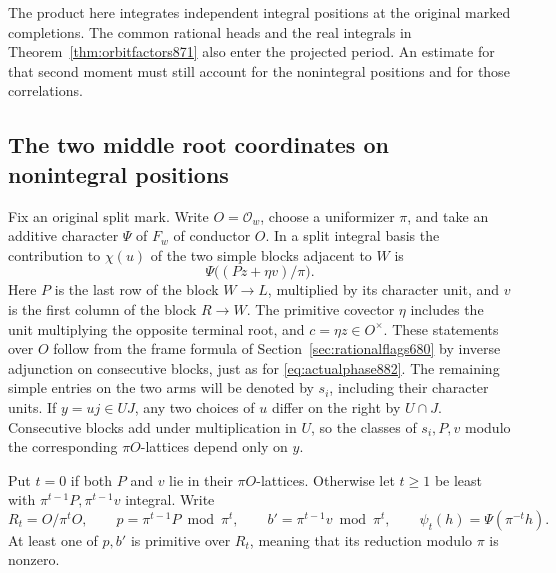 \documentclass[a4paper,11pt]{article}
\theoremstyle{definition}
\theoremstyle{remark}
\numberwithin{equation}{section}
\begin{document}
The product here integrates independent integral positions at the
original marked completions. The common rational heads and the real
integrals in Theorem~\ref{thm:orbitfactors871} also enter the
projected period. An estimate for that second moment must still
account for the nonintegral positions and for those correlations.
\clearpage

\subsection{The two middle root coordinates on nonintegral positions}
\label{sec:allpositions883}

Fix an original split mark. Write \(O=\mathcal O_w\), choose a
uniformizer \(\pi\), and take an additive character \(\Psi\) of \(F_w\)
of conductor \(O\). In a split integral basis the contribution to
\(\chi(u)\) of the two simple blocks adjacent to \(W\) is
\[
             \Psi\big((Pz+\eta v)/\pi\big).
\]
Here \(P\) is the last row of the block \(W\to L\), multiplied
by its character unit, and \(v\) is the first column of the
block \(R\to W\). The primitive covector \(\eta\) includes the
unit multiplying the opposite terminal root, and \(c=\eta z\in
O^\times\). These statements over \(O\) follow from the frame
formula of Section~\ref{sec:rationalflags680} by inverse adjunction
on consecutive blocks, just as for \eqref{eq:actualphase882}.
The remaining simple entries on the two arms will be denoted by
\(s_i\), including their character units. If \(y=u j\in UJ\),
any two choices of \(u\) differ on the right by \(U\cap J\).
Consecutive blocks add under multiplication in \(U\), so the
classes of \(s_i,P,v\) modulo the corresponding \(\pi O\)-lattices
depend only on \(y\).

Put \(t=0\) if both \(P\) and \(v\) lie in their \(\pi O\)-lattices.
Otherwise let \(t\ge1\) be least with \(\pi^{t-1}P,\pi^{t-1}v\)
integral. Write
\[
 R_t=O/\pi^tO,\qquad p=\pi^{t-1}P\bmod\pi^t,\qquad
 b'=\pi^{t-1}v\bmod\pi^t,\qquad
 \psi_t(h)=\Psi(\pi^{-t}h).
\]
At least one of \(p,b'\) is primitive over \(R_t\), meaning that
its reduction modulo \(\pi\) is nonzero.
\end{document}
